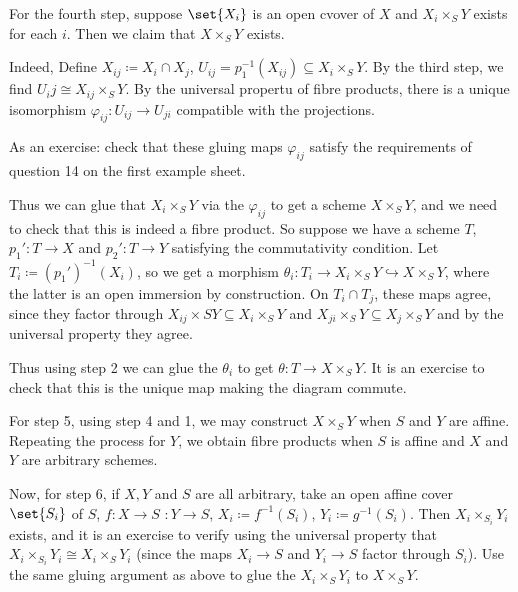 For the fourth step, suppose $\set{X_i}$ is an open cvover of $X$ and $X_i\times_S Y$
exists for each $i$. Then we claim that $X\times_S Y$ exists.

Indeed, Define $X_{ij}\coloneqq X_i\cap X_j$, $U_{ij} = p_1^{-1}(X_{ij}) \subseteq X_i\times_S Y$.
By the third step, we find $U_ij\cong X_{ij}\times_S Y$. By the universal propertu
of fibre products, there is a unique isomorphism $\varphi_{ij}\colon U_{ij}\to U_{ji}$
compatible with the projections.

As an exercise: check that these gluing maps $\varphi_{ij}$ satisfy the
requirements of question 14 on the first example sheet.

Thus we can glue that $X_i\times_S Y$ via the  $\varphi_{ij}$ to get a scheme
$X\times_S Y$, and we need to check that this is indeed a fibre product.
So suppose we have a scheme $T$, $p_1'\colon T\to X$ and $p_2'\colon T\to Y$ satisfying
the commutativity condition.
Let $T_i\coloneqq (p_1')^{-1}(X_i)$, so we get a morphism $\theta_i\colon T_i\to X_i\times_S Y \hookrightarrow X\times_S Y$,
where the latter is an open immersion by construction. On $T_i\cap T_j$, these maps
agree, since they factor through  $X_{ij}\times S Y \subseteq X_i\times_S Y$ and
$X_{ji}\times_S Y \subseteq X_j\times_S Y$ and by the universal property they agree.

Thus using step 2 we can glue the $\theta_i$ to get $\theta\colon T\to X\times_S Y$.
It is an exercise to check that this is the unique map making the diagram commute.

For step 5, using step 4 and 1, we may construct $X\times_S Y$ when $S$ and $Y$
are affine. Repeating the process for $Y$, we obtain fibre products when
$S$ is affine and $X$ and $Y$ are arbitrary schemes.

Now, for step 6, if $X, Y$ and $S$ are all arbitrary, take an open affine cover
$\set{S_i}$ of $S$, $f\colon X\to S$ $\colon Y\to S$, $X_i\coloneqq f^{-1}(S_i)$,
$Y_i\coloneqq g^{-1}(S_i)$. Then $X_i\times_{S_i} Y_i$ exists, and it is an exercise
to verify using the universal property that $X_i\times_{S_i}Y_i\cong X_i\times_S Y_i$
(since the maps $X_i\to S$ and $Y_i\to S$ factor through $S_i$).
Use the same gluing argument as above to glue the $X_i\times_S Y_i$ to $X\times_S Y$.
